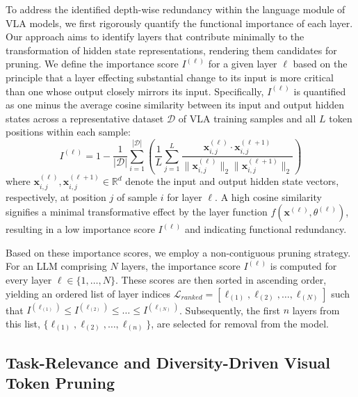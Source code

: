 To address the identified depth-wise redundancy within the language module of VLA models, we first rigorously quantify the functional importance of each layer. Our approach aims to identify layers that contribute minimally to the transformation of hidden state representations, rendering them candidates for pruning. We define the importance score $I^{(\ell)}$ for a given layer $\ell$ based on the principle that a layer effecting substantial change to its input is more critical than one whose output closely mirrors its input. Specifically, $I^{(\ell)}$ is quantified as one minus the average cosine similarity between its input and output hidden states across a representative dataset $\mathcal{D}$ of VLA training samples and all $L$ token positions within each sample:
\begin{equation}
I^{(\ell)} = 1 - \frac{1}{|\mathcal{D}|} \sum_{i=1}^{|\mathcal{D}|} \left( \frac{1}{L} \sum_{j=1}^L \frac{\boldsymbol{x}^{(\ell)}_{i,j} \cdot \boldsymbol{x}^{(\ell+1)}_{i,j}}{\|\boldsymbol{x}^{(\ell)}_{i,j}\|_2 \|\boldsymbol{x}^{(\ell+1)}_{i,j}\|_2} \right)
\label{eq:layer_importance_score}
\end{equation}
where $\boldsymbol{x}^{(\ell)}_{i,j}, \boldsymbol{x}^{(\ell+1)}_{i,j} \in \mathbb{R}^d$ denote the input and output hidden state vectors, respectively, at position $j$ of sample $i$ for layer $\ell$. A high cosine similarity signifies a minimal transformative effect by the layer function $f(\boldsymbol{x}^{(\ell)}, \theta^{(\ell)})$, resulting in a low importance score $I^{(\ell)}$ and indicating functional redundancy.

Based on these importance scores, we employ a non-contiguous pruning strategy. For an LLM comprising $N$ layers, the importance score $I^{(\ell)}$ is computed for every layer $\ell \in \{1, \dots, N\}$. These scores are then sorted in ascending order, yielding an ordered list of layer indices $\mathcal{L}_{ranked} = [\ell_{(1)}, \ell_{(2)}, \dots, \ell_{(N)}]$ such that $I^{(\ell_{(1)})} \leq I^{(\ell_{(2)})} \leq \dots \leq I^{(\ell_{(N)})}$. Subsequently, the first $n$ layers from this list, $\{\ell_{(1)}, \ell_{(2)}, \dots, \ell_{(n)}\}$, are selected for removal from the model.




\subsection{Task-Relevance and Diversity-Driven Visual Token Pruning}



